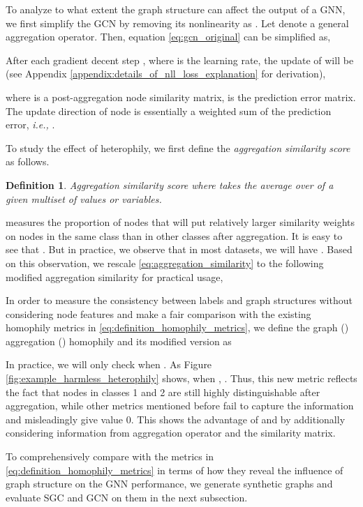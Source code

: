 \documentclass{article}
\newcommand\ie{\textit{i.e.,}}
\newcommand{\0}{{\boldsymbol{0}}}
\newcommand{\6}{{\partial}}
\newcommand{\8}{{\infty}}
\newcommand{\4}{{\nabla}}
\newtheorem{definition}{Definition}
\begin{document}
To analyze to what extent the graph structure can affect the output of a GNN, we first simplify the GCN by removing its nonlinearity as \cite{wu2019simplifying}. Let  denote a general aggregation operator. Then, equation \eqref{eq:gcn_original} can be simplified as,

After each gradient decent step , where  is the learning rate, the update of  will be (see Appendix \ref{appendix:details_of_nll_loss_explanation} for  derivation),

where  is a post-aggregation node similarity matrix,  is the prediction error matrix. The update direction of node  is essentially a weighted sum of the prediction error, \ie{} . 

To study the effect of heterophily, we first define the {\em aggregation similarity score} as follows.

\begin{definition} Aggregation similarity score 
where  takes the average over  of a given multiset of values or variables.
\end{definition}
 measures the proportion of nodes  that will put relatively larger similarity weights on nodes in the same class than in other classes after aggregation. It is easy to see that . But in practice, we observe that in most datasets, we will have . Based on this observation, we rescale \eqref{eq:aggregation_similarity} to the following modified aggregation similarity for practical usage,

In order to measure the consistency between labels and graph structures without considering node features and make a fair comparison with the existing homophily metrics in \eqref{eq:definition_homophily_metrics}, we define the graph () aggregation () homophily and its modified version as

In practice, we will only check  when . As Figure \ref{fig:example_harmless_heterophily} shows, when , . Thus, this new metric reflects the fact that nodes in classes 1 and 2 are still highly distinguishable after aggregation,
while other metrics mentioned before fail to capture the information and misleadingly give value 0. This shows the advantage of  and  by additionally considering information from aggregation operator  and the similarity matrix.

To comprehensively compare  with the metrics in \eqref{eq:definition_homophily_metrics} in terms of how they reveal the influence of graph structure on the GNN performance, we generate synthetic graphs and evaluate SGC \cite{wu2019simplifying} and GCN \cite{kipf2016classification} on them in the next subsection.
\end{document}
